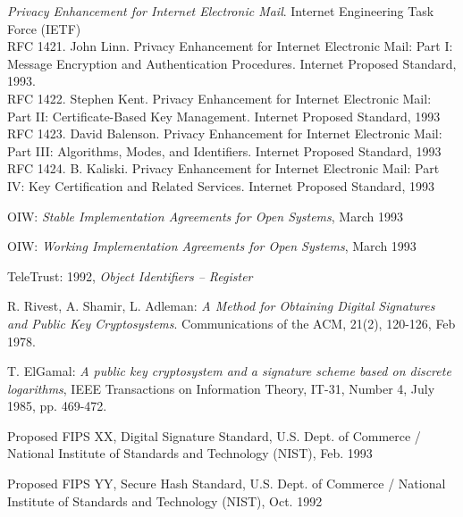 \begin{thebibliography}{99}
{\em Privacy Enhancement for Internet Electronic Mail}.
Internet Engineering Task Force (IETF) \\
RFC 1421. John Linn.  Privacy Enhancement for Internet Electronic Mail:  Part I:
Message Encryption and Authentication Procedures.  Internet Proposed Standard,
1993. \\
RFC 1422. Stephen Kent.  Privacy Enhancement for Internet Electronic Mail:  Part
II: Certificate-Based Key Management.  Internet Proposed Standard, 1993 \\
RFC 1423. David Balenson.  Privacy Enhancement for Internet Electronic Mail:
Part III: Algorithms, Modes, and Identifiers.  Internet Proposed Standard, 1993 \\
RFC 1424. B. Kaliski.  Privacy Enhancement for Internet Electronic Mail:  Part IV:
Key Certification and Related Services.  Internet Proposed Standard, 1993

OIW: {\em Stable Implementation Agreements for Open Systems}, 
March 1993

OIW: {\em Working Implementation Agreements for Open Systems}, 
March 1993

TeleTrust: 1992, {\em Object Identifiers -- Register}

R. Rivest, A. Shamir, L. Adleman:
{\em A Method  for Obtaining Digital Signatures
and Public Key Cryptosystems}.
Communications of the ACM, 21(2), 120-126, Feb 1978.

T. ElGamal:  {\em A  public key  cryptosystem  and  a signature
scheme  based  on discrete logarithms}, IEEE  Transactions on
Information    Theory,  IT-31,  Number  4,  July  1985,  pp.
469-472.

Proposed FIPS XX, Digital Signature Standard, U.S. Dept. of Commerce /
National Institute of Standards and Technology (NIST), Feb. 1993 

Proposed FIPS YY, Secure Hash Standard, U.S. Dept. of Commerce /
National Institute of Standards and Technology (NIST), Oct. 1992 


\end{thebibliography}
